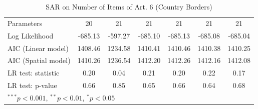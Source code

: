 \begin{table}[!h]
\begin{center}
\begin{tabular}{l c c c c c c }
Parameters              & 20           & 21            & 21           & 21           & 21           & 21           \\
Log Likelihood          & -685.13      & -597.27       & -685.10      & -685.13      & -685.08      & -685.04      \\
AIC (Linear model)      & 1408.46      & 1234.58       & 1410.41      & 1410.46      & 1410.38      & 1410.25      \\
AIC (Spatial model)     & 1410.26      & 1236.54       & 1412.20      & 1412.26      & 1412.16      & 1412.08      \\
LR test: statistic      & 0.20         & 0.04          & 0.21         & 0.20         & 0.22         & 0.17         \\
LR test: p-value        & 0.66         & 0.85          & 0.65         & 0.66         & 0.64         & 0.68         \\
\bottomrule
\multicolumn{7}{l}{\scriptsize{$^{***}p<0.001$, $^{**}p<0.01$, $^*p<0.05$}}
\end{tabular}
\caption{SAR on Number of Items of Art. 6 (Country Borders)}
\label{table:coefficients}
\end{center}
\end{table}
